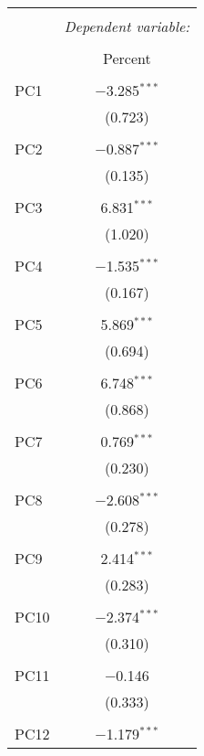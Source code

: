 
\begin{table}[!htbp] \centering 
  \caption{} 
  \label{} 
\begin{tabular}{@{\extracolsep{5pt}}lc} 
\\[-1.8ex]\hline 
\hline \\[-1.8ex] 
 & \multicolumn{1}{c}{\textit{Dependent variable:}} \\ 
\cline{2-2} 
\\[-1.8ex] & Percent \\ 
\hline \\[-1.8ex] 
 PC1 & $-$3.285$^{***}$ \\ 
  & (0.723) \\ 
  & \\ 
 PC2 & $-$0.887$^{***}$ \\ 
  & (0.135) \\ 
  & \\ 
 PC3 & 6.831$^{***}$ \\ 
  & (1.020) \\ 
  & \\ 
 PC4 & $-$1.535$^{***}$ \\ 
  & (0.167) \\ 
  & \\ 
 PC5 & 5.869$^{***}$ \\ 
  & (0.694) \\ 
  & \\ 
 PC6 & 6.748$^{***}$ \\ 
  & (0.868) \\ 
  & \\ 
 PC7 & 0.769$^{***}$ \\ 
  & (0.230) \\ 
  & \\ 
 PC8 & $-$2.608$^{***}$ \\ 
  & (0.278) \\ 
  & \\ 
 PC9 & 2.414$^{***}$ \\ 
  & (0.283) \\ 
  & \\ 
 PC10 & $-$2.374$^{***}$ \\ 
  & (0.310) \\ 
  & \\ 
 PC11 & $-$0.146 \\ 
  & (0.333) \\ 
  & \\ 
 PC12 & $-$1.179$^{***}$ \\ 

\end{tabular}
\end{table}
